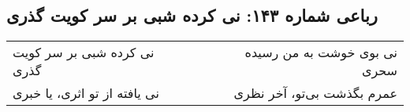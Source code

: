 \begin{center}
\section*{رباعی شماره ۱۴۳: نی کرده شبی بر سر کویت گذری}
\label{sec:143}
\begin{longtable}{l p{0.5cm} r}
نی کرده شبی بر سر کویت گذری
&&
نی بوی خوشت به من رسیده سحری
\\
نی یافته از تو اثری، یا خبری
&&
عمرم بگذشت بی‌تو، آخر نظری
\\
\end{longtable}
\end{center}
